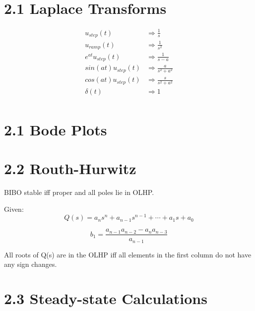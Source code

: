 \section*{2.1 Laplace Transforms}
\begin{equation*}
    \begin{aligned}
        u_{step}(t)        & \Rightarrow \frac{1}{s}         \\
        u_{ramp}(t)        & \Rightarrow \frac{1}{s^2}       \\
        e^{at}u_{step}(t)  & \Rightarrow \frac{1}{s - a}     \\
        sin(at)u_{step}(t) & \Rightarrow \frac{a}{s^2 + a^2} \\
        cos(at)u_{step}(t) & \Rightarrow \frac{s}{s^2 + a^2} \\
        \delta(t)          & \Rightarrow 1                   \\
    \end{aligned}
\end{equation*}

\section*{2.1 Bode Plots}



\section*{2.2 Routh-Hurwitz}

BIBO stable iff proper and all poles lie in OLHP.

Given:
\begin{equation*}
    Q(s) = a_n s^n + a_{n-1}s^{n-1} + \cdots + a_1 s + a_0
\end{equation*}

\begin{equation*}
    b_1 = \frac{a_{n-1}a_{n-2} - a_n a_{n-3}}{a_{n-1}}
\end{equation*}

All roots of Q(s) are in the OLHP iff all elements in the first column do not have any sign changes.

\section*{2.3 Steady-state Calculations}

